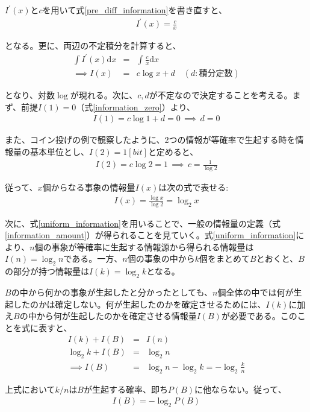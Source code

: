 \documentclass[uplatex,dvipdfmx,b5j,10pt]{jsbook}
\theoremstyle{definition}
\begin{document}
$I^{\prime}(x)$と$c$を用いて式\ref{pre_diff_information}を書き直すと、
\begin{eqnarray*}
  I^{\prime}(x) = \frac{c}{x}
\end{eqnarray*}

となる。更に、両辺の不定積分を計算すると、
\begin{eqnarray*}
  \int I^{\prime}(x) \textrm{d}x &=& \int \frac{c}{x} \textrm{d}x \\
  \implies I(x) &=& c \log x + d \quad (d: 積分定数)
\end{eqnarray*}

となり、対数$\log$が現れる。次に、$c,d$が不定なので決定することを考える。まず、前提$I(1) = 0$（式\ref{information_zero}）より、
\begin{eqnarray*}
  I(1) = c \log 1 + d = 0 \, \implies \, d = 0
\end{eqnarray*}

また、コイン投げの例で観察したように、2つの情報が等確率で生起する時を情報量の基本単位とし、$I(2) = 1[bit]$と定めると、
\begin{eqnarray*}
  I(2) = c \log 2 = 1 \, \implies \, c = \frac{1}{\log 2}
\end{eqnarray*}

従って、$x$個からなる事象の情報量$I(x)$は次の式で表せる:
\begin{eqnarray} \label{uniform_information}
  I(x) = \frac{\log x}{\log 2} = \log_{2} x
\end{eqnarray}

次に、式\ref{uniform_information}を用いることで、一般の情報量の定義（式\ref{information_amount}）が得られることを見ていく。式\ref{uniform_information}により、$n$個の事象が等確率に生起する情報源から得られる情報量は$I(n) = \log_{2} n$である。一方、$n$個の事象の中から$k$個をまとめて$B$とおくと、$B$の部分が持つ情報量は$I(k) = \log_{2} k$となる。

$B$の中から何かの事象が生起したと分かったとしても、$n$個全体の中では何が生起したのかは確定しない。何が生起したのかを確定させるためには、$I(k)$に加え$B$の中から何が生起したのかを確定させる情報量$I(B)$が必要である。このことを式に表すと、
\begin{eqnarray*}
  I(k) + I(B) &=& I(n) \\
  \log_{2} k + I(B) &=& \log_{2} n \\
  \implies I(B) &=& \log_{2} n - \log_{2} k = - \log_{2} \frac{k}{n} 
\end{eqnarray*}

上式において$k/n$は$B$が生起する確率、即ち$P(B)$に他ならない。従って、
\begin{eqnarray*}
  I(B) = - \log_{2} P(B)
\end{eqnarray*}
\end{document}
